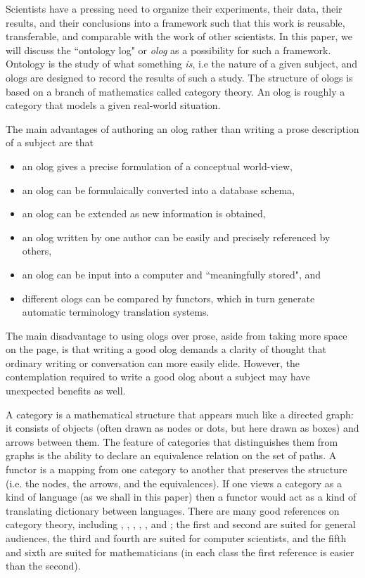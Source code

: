 \documentclass{amsart}
\theoremstyle{remark}
\theoremstyle{definition}
\begin{document}
Scientists have a pressing need to organize their experiments, their data, their results, and their conclusions into a framework such that this work is reusable, transferable, and comparable with the work of other scientists. In this paper, we will discuss the ``ontology log" or {\em olog} as a possibility for such a framework. Ontology is the study of what something {\em is}, i.e the nature of a given subject, and ologs are designed to record the results of such a study. The structure of ologs is based on a branch of mathematics called category theory. An olog is roughly a category that models a given real-world situation. 

The main advantages of authoring an olog rather than writing a prose description of a subject are that \begin{itemize}\item an olog gives a precise formulation of a conceptual world-view,\item an olog can be formulaically converted into a database schema,\item an olog can be extended as new information is obtained,\item an olog written by one author can be easily and precisely referenced by others,\item an olog can be input into a computer and ``meaningfully stored", and\item different ologs can be compared by functors, which in turn  generate automatic terminology translation systems.\end{itemize}  The main disadvantage to using ologs over prose, aside from taking more space on the page, is that writing a good olog demands a clarity of thought that ordinary writing or conversation can more easily elide. However, the contemplation required to write a good olog about a subject may have unexpected benefits as well.

A category is a mathematical structure that appears much like a directed graph: it consists of objects (often drawn as nodes or dots, but here drawn as boxes) and arrows between them. The feature of categories that distinguishes them from graphs is the ability to declare an equivalence relation on the set of paths. A functor is a mapping from one category to another that preserves the structure (i.e. the nodes, the arrows, and the equivalences). If one views a category as a kind of language (as we shall in this paper) then a functor would act as a kind of translating dictionary between languages. There are many good references on category theory, including \cite{LS}, \cite{Sic}, \cite{Pie}, \cite{BW1}, \cite{Awo}, and \cite{Mac}; the first and second are suited for general audiences, the third and fourth are suited for computer scientists, and the fifth and sixth are suited for mathematicians (in each class the first reference is easier than the second).
\end{document}
